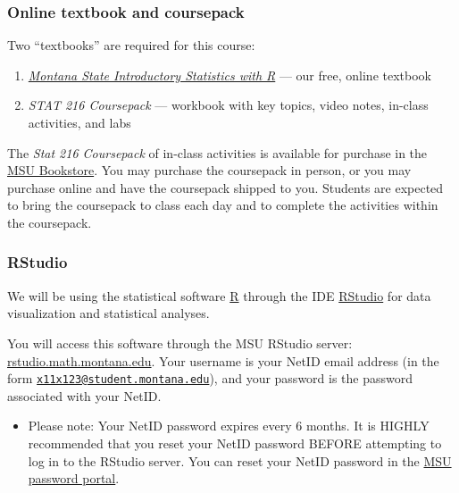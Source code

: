 \documentclass[
]{article}
\providecommand{\tightlist}{%
  \setlength{\itemsep}{0pt}\setlength{\parskip}{0pt}}
\begin{document}
\subsubsection{Online textbook and
coursepack}\label{online-textbook-and-coursepack}

Two ``textbooks'' are required for this course:

\begin{enumerate}
\def\labelenumi{\arabic{enumi}.}
\tightlist
\item
  \href{https://mtstateintrostats.github.io/IntroStatTextbook/}{\emph{Montana
  State Introductory Statistics with R}} --- our free, online textbook
\item
  \emph{STAT 216 Coursepack} --- workbook with key topics, video notes,
  in-class activities, and labs
\end{enumerate}

The \emph{Stat 216 Coursepack} of in-class activities is available for
purchase in the \href{https://www.msubookstore.org/}{MSU Bookstore}. You
may purchase the coursepack in person, or you may purchase online and
have the coursepack shipped to you. Students are expected to bring the
coursepack to class each day and to complete the activities within the
coursepack.

\subsubsection{RStudio}\label{rstudio}

We will be using the statistical software
\href{https://www.r-project.org/}{R} through the IDE
\href{https://rstudio.com/products/rstudio/}{RStudio} for data
visualization and statistical analyses.

You will access this software through the MSU RStudio server:
\href{https://rstudio.math.montana.edu/}{rstudio.math.montana.edu}. Your
username is your NetID email address (in the form
\href{mailto:x11x123@student.montana.edu}{\nolinkurl{x11x123@student.montana.edu}}),
and your password is the password associated with your NetID.

\begin{itemize}
\tightlist
\item
  Please note: Your NetID password expires every 6 months. It is HIGHLY
  recommended that you reset your NetID password BEFORE attempting to
  log in to the RStudio server. You can reset your NetID password in the
  \href{https://pwreset.montana.edu/react/}{MSU password portal}.
\end{itemize}
\end{document}
